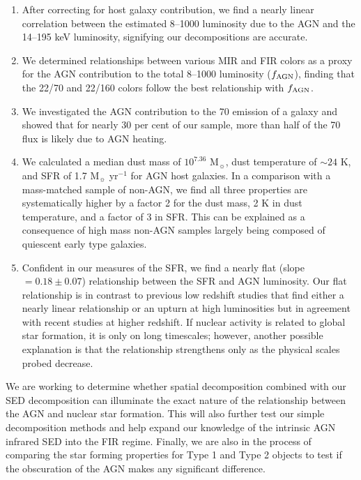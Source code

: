 \documentclass[fleqn, usenatbib]{mnras}
\newcommand{\msun}{M$_{\sun}$}
\begin{document}
\begin{enumerate}
\item After correcting for host galaxy contribution, we find a nearly linear correlation between the estimated 8--1000 \micron{} luminosity due to the AGN and the 14--195 keV luminosity, signifying our decompositions are accurate.

\item We determined relationships between various MIR and FIR colors as a proxy for the AGN contribution to the total 8--1000 \micron{} luminosity ($f_{\rm AGN}$), finding that the 22/70 and 22/160 colors follow the best relationship with $f_{\rm AGN}$. 

\item We investigated the AGN contribution to the 70 \micron{} emission of a galaxy and showed that for nearly 30 per cent of our sample, more than half of the 70 \micron{} flux is likely due to AGN heating.

\item We calculated a median dust mass of $10^{7.36}$ \msun{}, dust temperature of $\sim 24$ K, and SFR of 1.7 \msun{} yr$^{-1}$ for AGN host galaxies. In a comparison with a mass-matched sample of non-AGN, we find all three properties are systematically higher by a factor 2 for the dust mass, 2 K in dust temperature, and a factor of 3 in SFR. This can be explained as a consequence of high mass non-AGN samples largely being composed of quiescent early type galaxies.

\item Confident in our measures of the SFR, we find a nearly flat (slope $= 0.18\pm0.07$) relationship between the SFR and AGN luminosity. Our flat relationship is in contrast to previous low redshift studies that find either a nearly linear relationship or an upturn at high luminosities but in agreement with recent studies at higher redshift. If nuclear activity is related to global star formation, it is only on long timescales; however, another possible explanation is that the relationship strengthens only as the physical scales probed decrease.
\end{enumerate}

We are working to determine whether spatial decomposition combined with our SED decomposition can illuminate the exact nature of the relationship between the AGN and nuclear star formation. This will also further test our simple decomposition methods and help expand our knowledge of the intrinsic AGN infrared SED into the FIR regime. Finally, we are also in the process of comparing the star forming properties for Type 1 and Type 2 objects to test if the obscuration of the AGN makes any significant difference.
\end{document}
